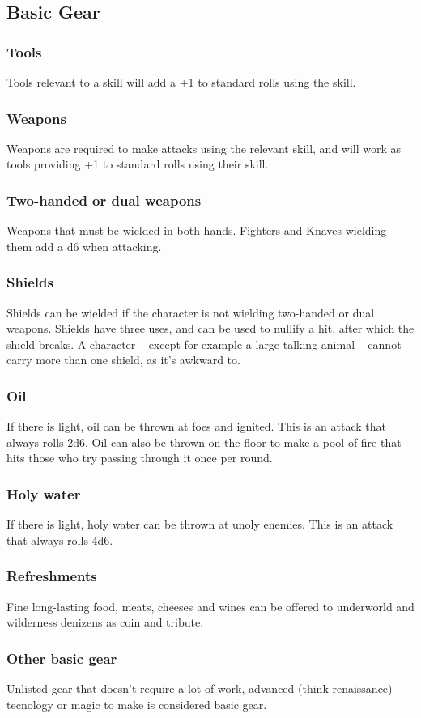 \subsection{Basic Gear}
\begin{multicols}{2}
\subsubsection*{Tools}
Tools relevant to a skill will add a +1 to standard rolls using the skill.

\subsubsection*{Weapons}
Weapons are required to make attacks using the relevant skill, and will work as tools providing +1 to standard rolls using their skill.

\subsubsection*{Two-handed or dual weapons}
Weapons that must be wielded in both hands. Fighters and Knaves wielding them add a d6 when attacking.

\subsubsection*{Shields}
Shields can be wielded if the character is not wielding two-handed or dual weapons. Shields have three uses, and can be used to nullify a hit, after which the shield breaks. A character -- except for example a large talking animal -- cannot carry more than one shield, as it's awkward to.

\subsubsection*{Oil}
If there is light, oil can be thrown at foes and ignited. This is an attack that always rolls 2d6. Oil can also be thrown on the floor to make a pool of fire that hits those who try passing through it once per round.

\subsubsection*{Holy water}
If there is light, holy water can be thrown at unoly enemies. This is an attack that always rolls 4d6.

\subsubsection*{Refreshments}
Fine long-lasting food, meats, cheeses and wines can be offered to underworld and wilderness denizens as coin and tribute.

\subsubsection*{Other basic gear}
Unlisted gear that doesn't require a lot of work, advanced (think renaissance) tecnology or magic to make is considered basic gear.

\end{multicols}

